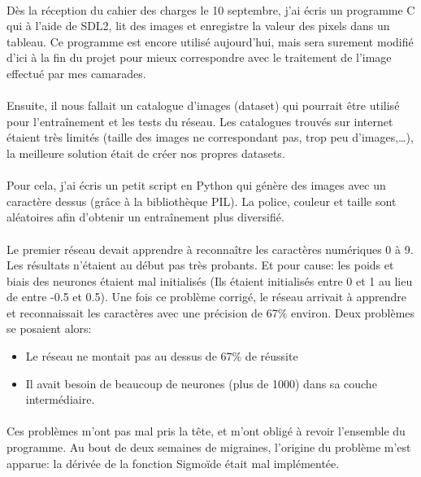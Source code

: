 \documentclass{article}
\begin{document}
\paragraph{} Dès la réception du cahier des charges le 10 septembre, j'ai écris un programme C qui à l'aide de SDL2, lit des images et enregistre la valeur des pixels dans un tableau. Ce programme est encore utilisé aujourd'hui, mais sera surement modifié d'ici à la fin du projet pour mieux correspondre avec le traitement de l'image effectué par mes camarades.

\paragraph{}Ensuite, il nous fallait un catalogue d'images (dataset) qui pourrait être utilisé pour l'entraînement et les tests du réseau. Les catalogues trouvés sur internet étaient très limités (taille des images ne correspondant pas, trop peu d'images,…), la meilleure solution était de créer nos propres datasets.

\paragraph{}Pour cela, j'ai écris un petit script en Python qui génère des images avec un caractère dessus (grâce à la bibliothèque PIL). La police, couleur et taille sont aléatoires afin d'obtenir un entraînement plus diversifié.

\paragraph{}Le premier réseau devait apprendre à reconnaître les caractères numériques 0 à 9. Les résultats n'étaient au début pas très probants. Et pour cause: les poids et biais des neurones étaient mal initialisés (Ils étaient initialisés entre 0 et 1 au lieu de entre -0.5 et 0.5). Une fois ce problème corrigé, le réseau arrivait à apprendre et reconnaissait les caractères avec une précision de 67\% environ. Deux problèmes se posaient alors:

\begin{itemize}
	\item Le réseau ne montait pas au dessus de 67\% de réussite
	\item Il avait besoin de beaucoup de neurones (plus de 1000) dans sa couche intermédiaire.
\end{itemize}

\paragraph{} Ces problèmes m'ont pas mal pris la tête, et m'ont obligé à revoir l'ensemble du programme.
Au bout de deux semaines de migraines, l'origine du problème m'est apparue: la dérivée de la fonction Sigmoïde était mal implémentée.
\end{document}
